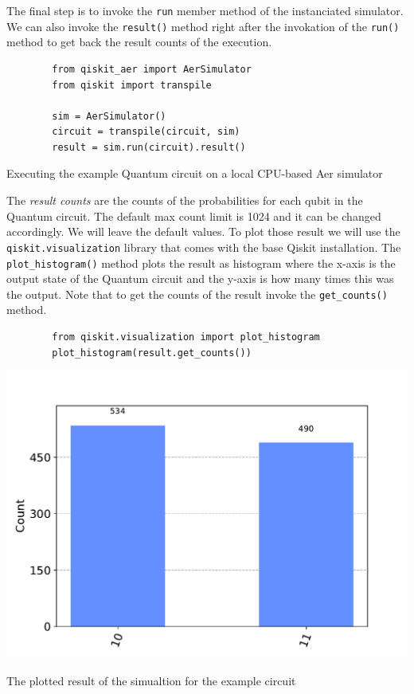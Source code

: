 The final step is to invoke the \verb|run| member method of the instanciated simulator. We can also
invoke the \verb|result()| method right after the invokation of the \verb|run()| method to get back the
result counts of the execution.

\begin{listing}[ht]
    \centering
    \begin{verbatim}
        from qiskit_aer import AerSimulator
        from qiskit import transpile

        sim = AerSimulator()
        circuit = transpile(circuit, sim)
        result = sim.run(circuit).result()
    \end{verbatim}
    \caption{Executing the example Quantum circuit on a local CPU-based Aer simulator}
\end{listing}

The \textit{result counts} are the counts of the probabilities for each qubit in the Quantum circuit. The default
max count limit is 1024 and it can be changed accordingly. We will leave the default values.
To plot those result we will use the \verb|qiskit.visualization| library that comes with the base Qiskit installation.
The \verb|plot_histogram()| method plots the result as histogram where the x-axis is the output state of the Quantum
circuit and the y-axis is how many times this was the output. Note that to get the counts of the result invoke the 
\verb|get_counts()| method.

\begin{listing}[ht]
    \centering
    \begin{verbatim}
        from qiskit.visualization import plot_histogram
        plot_histogram(result.get_counts())
    \end{verbatim}
    \centering
    \includegraphics[scale=0.8]{images/4_Qiskit/example_circuit_counts_plot.pdf}
    \caption{The plotted result of the simualtion for the example circuit}
\end{listing}


